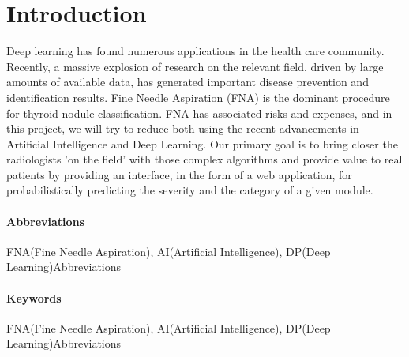 \chapter{Introduction}
\label{1}

Deep learning has found numerous applications in the health care community. Recently, a massive explosion of research on the relevant field, 
driven by large amounts of available data, has generated important disease prevention and identification results. Fine Needle Aspiration (FNA) 
is the dominant procedure for thyroid nodule classification. FNA has associated risks and expenses, and in this project,
we will try to reduce both using the recent advancements in Artificial Intelligence and Deep Learning. Our primary goal is to 
bring closer the radiologists 'on the field' with those complex algorithms and provide value to real patients by providing an interface, 
in the form of a web application, for probabilistically predicting the severity and the category of a given module.

\subsubsection{Abbreviations}FNA(Fine Needle Aspiration), AI(Artificial Intelligence), DP(Deep Learning)Abbreviations 
\subsubsection{Keywords}FNA(Fine Needle Aspiration), AI(Artificial Intelligence), DP(Deep Learning)Abbreviations 


